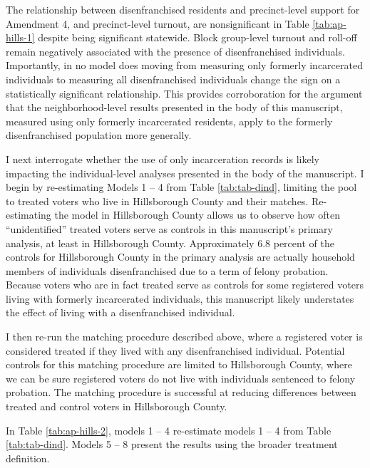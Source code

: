 \documentclass[
  12pt,
]{article}
\begin{document}
\begin{singlespace}


\end{singlespace}

The relationship between disenfranchised residents and precinct-level support for Amendment 4, and precinct-level turnout, are nonsignificant in Table \ref{tab:ap-hills-1} despite being significant statewide. Block group-level turnout and roll-off remain negatively associated with the presence of disenfranchised individuals. Importantly, in no model does moving from measuring only formerly incarcerated individuals to measuring all disenfranchised individuals change the sign on a statistically significant relationship. This provides corroboration for the argument that the neighborhood-level results presented in the body of this manuscript, measured using only formerly incarcerated residents, apply to the formerly disenfranchised population more generally.

I next interrogate whether the use of only incarceration records is likely impacting the individual-level analyses presented in the body of the manuscript. I begin by re-estimating Models 1 -- 4 from Table \ref{tab:tab-dind}, limiting the pool to treated voters who live in Hillsborough County and their matches. Re-estimating the model in Hillsborough County allows us to observe how often ``unidentified'' treated voters serve as controls in this manuscript's primary analysis, at least in Hillsborough County. Approximately 6.8 percent of the controls for Hillsborough County in the primary analysis are actually household members of individuals disenfranchised due to a term of felony probation. Because voters who are in fact treated serve as controls for some registered voters living with formerly incarcerated individuals, this manuscript likely understates the effect of living with a disenfranchised individual.

I then re-run the matching procedure described above, where a registered voter is considered treated if they lived with any disenfranchised individual. Potential controls for this matching procedure are limited to Hillsborough County, where we can be sure registered voters do not live with individuals sentenced to felony probation. The matching procedure is successful at reducing differences between treated and control voters in Hillsborough County.

In Table \ref{tab:ap-hills-2}, models 1 -- 4 re-estimate models 1 -- 4 from Table \ref{tab:tab-dind}. Models 5 -- 8 present the results using the broader treatment definition.
\end{document}

